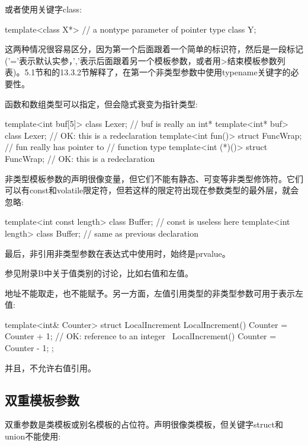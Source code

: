 或者使用关键字class:

\begin{cpp}
template<class X*> // a nontype parameter of pointer type
class Y;
\end{cpp}

这两种情况很容易区分，因为第一个后面跟着一个简单的标识符，然后是一段标记('='表示默认实参，','表示后面跟着另一个模板参数，或者用>结束模板参数列表)。5.1节和的13.3.2节解释了，在第一个非类型参数中使用typename关键字的必要性。

函数和数组类型可以指定，但会隐式衰变为指针类型:

\begin{cpp}
template<int buf[5]> class Lexer; // buf is really an int*
template<int* buf> class Lexer; // OK: this is a redeclaration
template<int fun()> struct FuncWrap; // fun really has pointer to
								     // function type
template<int (*)()> struct FuncWrap; // OK: this is a redeclaration
\end{cpp}

非类型模板参数的声明很像变量，但它们不能有静态、可变等非类型修饰符。它们可以有const和volatile限定符，但若这样的限定符出现在参数类型的最外层，就会忽略:

\begin{cpp}
template<int const length> class Buffer; // const is useless here
template<int length> class Buffer; // same as previous declaration
\end{cpp}

最后，非引用非类型参数在表达式中使用时，始终是prvalue。 

\begin{notice}
参见附录B中关于值类别的讨论，比如右值和左值。
\end{notice}

地址不能取走，也不能赋予。另一方面，左值引用类型的非类型参数可用于表示左值:

\begin{cpp}
template<int& Counter>
struct LocalIncrement {
	LocalIncrement() { Counter = Counter + 1; } // OK: reference to an integer
	~LocalIncrement() { Counter = Counter - 1; }
};
\end{cpp}

并且，不允许右值引用。

\subsection{双重模板参数}

双重参数是类模板或别名模板的占位符。声明很像类模板，但关键字struct和union不能使用:

